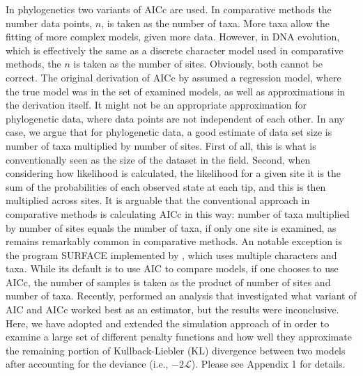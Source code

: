 \documentclass[12pt,letterpaper]{article}
\newcommand{\Lik}{\ensuremath{\mathcal{L}}\xspace}%
\begin{document}
In phylogenetics two variants of AICc are used.
In comparative methods \citep{e.g., ButlerKing2004, OMearaetal2006, BeaulieuEtAl2013} the number data points, $n$, is taken as the number of taxa.
More taxa allow the fitting of more complex models, given more data.
However, in DNA evolution, which is effectively the same as a discrete character model used in comparative methods, the $n$ is taken as the number of sites.
Obviously, both cannot be correct.
The original derivation of AICc by \citet{HurvichTsai1989} assumed a regression model, where the true model was in the set of examined models, as well as approximations in the derivation itself.
It might not be an appropriate approximation for phylogenetic data, where data points are not independent of each other.
In any case, we argue that for phylogenetic data, a good estimate of data set size is number of taxa multiplied by number of sites.
First of all, this is what is conventionally seen as the size of the dataset in the field.
Second, when considering how likelihood is calculated, the likelihood for a given site it is the sum of the probabilities of each observed state at each tip, and this is then multiplied across sites.
It is arguable that the conventional approach in comparative methods is calculating AICc in this way: number of taxa multiplied by number of sites equals the number of taxa, if only one site is examined, as remains remarkably common in comparative methods.
An notable exception is the program SURFACE implemented by \citet{IngramMahler2013}, which uses multiple characters and taxa.
While its default is to use AIC to compare models, if one chooses to use AICc, the number of samples is taken as the product of number of sites and number of taxa.
Recently, \citet{Jhwuengetal2014} performed an analysis that investigated what variant of AIC and AICc worked best as an estimator, but the results were inconclusive.
Here, we have adopted and extended the simulation approach of \citet{Jhwuengetal2014} in order to examine a large set of different penalty functions and how well they approximate the remaining portion of Kullback-Liebler (KL) divergence between two models after accounting for the deviance (i.e., $-2\Lik$).
Please see Appendix 1 for details.
\end{document}

